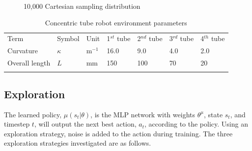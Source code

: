 \begin{figure}
    
    \caption{10,000 Cartesian sampling distribution}
    \label{fig:2}%
\end{figure}

\begin{table}
\begin{tabular}{lllllll}
\hline\noalign{\smallskip}
Term & Symbol & Unit & 1$^{st}$ tube & 2$^{nd}$ tube & 3$^{rd}$ tube & 4$^{th}$ tube\\
\noalign{\smallskip}\hline\noalign{\smallskip}
Curvature & $\kappa$ & m$^{-1}$ & 16.0 & 9.0 & 4.0 & 2.0\\
Overall length & $L$ & mm & 150 & 100 & 70 & 20\\
\noalign{\smallskip}\hline
\end{tabular}
\caption{Concentric tube robot environment parameters}
\label{tube-env-params}
\end{table}

\subsection{Exploration}
The learned policy, $\mu(s_t | \theta)$, is the MLP network with weights $\theta^\mu$, state $s_t$, and timestep $t$, will output the next best action, $a_t$, according to the policy. Using an exploration strategy, noise is added to the action during training. The three exploration strategies investigated are as follows.

